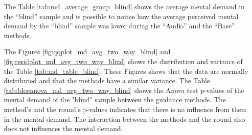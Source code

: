 The Table \ref{tab:md_average_group_blind} shows the average mental demand in the “blind” sample and is possible to notice how the average perceived mental demand by the “blind” sample was lower during the “Audio” and the “Base” methods.



The Figures \ref{fig:qqplot_md_avg_two_way_blind} and \ref{fig:residplot_md_avg_two_way_blind} shows the distribution and variance of the Table \ref{tab:md_table_blind}. These Figures shows that the data are normally distributed and that the methods have a similar variance.
The Table \ref{tab:blocanova_md_avg_two_way_blind} shows the Anova test p-values of the mental demand of the "blind" sample between the guidance methods. The method's and the round's p-values indicates that there is no influence from them in the mental demand. The interaction between the methods and the round also does not influences the mental demand.



